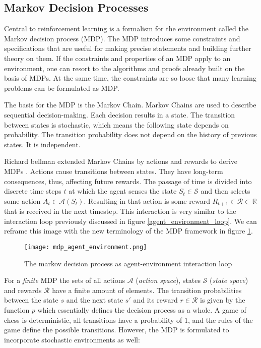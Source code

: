 \subsection{Markov Decision Processes}
Central to reinforcement learning is a formalism for the environment called the Markov decision process (MDP). The MDP introduces some constraints and specifications that are useful for making precise statements and building further theory on them. If the constraints and properties of an MDP apply to an environment, one can resort to the algorithms and proofs already built on the basis of MDPs. At the same time, the constraints are so loose that many learning problems can be formulated as MDP.

The basis for the MDP is the Markov Chain. Markov Chains are used to describe sequential decision-making. Each decision results in a state. The transition between states is stochastic, which means the following state depends on probability. The transition probability does not depend on the history of previous states. It is independent.

Richard bellman extended Markov Chains by actions and rewards to derive MDPs \cite{yang_markov_2019, bellman_markovian_1957}. Actions cause transitions between states. They have long-term consequences, thus, affecting future rewards. The passage of time is divided into discrete time steps $ t $ at which the agent senses the state $ S_t \in \mathcal{S} $ and then selects some action $ A_t \in \mathcal{A}(S_t) $. Resulting in that action is some reward $ R_{t+1} \in \mathcal{R} \subset \mathbb{R} $ that is received in the next timestep. This interaction is very similar to the interaction loop previously discussed in figure \ref{agent_environment_loop}. We can reframe this image with the new terminology of the MDP framework in figure \ref{mdp_agent_environment}.

\begin{figure}
    \centering
    \texttt{[image: mdp\_agent\_environment.png]}
    \caption{The markov decision process as agent-environment interaction loop \cite[cf. p. 48]{sutton_reinforcement_2018}}
    \label{mdp_agent_environment}
\end{figure}

For a \textit{finite} MDP the sets of all actions $ \mathcal{A}$ (\textit{action space}), states $\mathcal{S}$ (\textit{state space}) and rewards $ \mathcal{R} $ have a finite amount of elements. The transition probabilities between the state $ s $ and the next state $ s' $ and its reward $r \in \mathcal{R}$ is given by the function $ p $ which essentially defines the decision process as a whole. A game of chess is deterministic, all transitions have a probability of $1$, and the rules of the game define the possible transitions. However, the MDP is formulated to incorporate stochastic environments as well:

